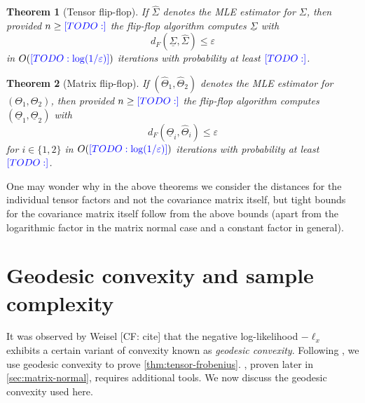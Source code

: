 \documentclass[aos]{imsart}
\newtheorem{theorem}{Theorem}
\theoremstyle{definition}
\newcommand{\eps}{\varepsilon}
\newcommand{\samp}{x}
\newcommand{\CF}[1]{{\color{purple}[CF: #1]}}
\newcommand{\TODO}[1]{{\color{blue}[TODO: #1]}}
\begin{document}
\begin{theorem}[Tensor flip-flop]\label{thm:tensor-flipflop} If $\hat{\Sigma}$ denotes the MLE estimator for $\Sigma$, then provided $n \geq \TODO{}$ the flip-flop algorithm computes $\underline{\Sigma}$ with
$$ d_F(\underline{\Sigma}, \hat{\Sigma}) \leq \eps $$
in $O(\TODO{\log(1/\eps)})$ iterations with probability at least $\TODO{}$.
\end{theorem}

\begin{theorem}[Matrix flip-flop]\label{thm:matrix-flipflop} If $(\hat{\Theta}_1, \hat{\Theta}_2) $ denotes the MLE estimator for $(\Theta_1, \Theta_2)$, then provided $n \geq \TODO{}$ the flip-flop algorithm computes $(\underline{\Theta}_1, \underline{\Theta}_2)$ with
$$ d_F(\underline{\Theta}_i, \hat{\Theta}_i) \leq \eps $$
for $i \in \{1,2\}$ in $O(\TODO{\log(1/\eps)})$ iterations with probability at least $\TODO{}$.
\end{theorem}

One may wonder why in the above theorems we consider the distances for the individual tensor factors and not the covariance matrix itself, but tight bounds for the covariance matrix itself follow from the above bounds (apart from the logarithmic factor in the matrix normal case and a constant factor in general).




\section{Geodesic convexity and sample complexity}\label{subsec:outline}
It was observed by Weisel \CF{cite} that the negative log-likelihood $-\ell_\samp$ exhibits a certain variant of convexity known as \emph{geodesic convexity}. Following \cite{FM20}, we use geodesic convexity to prove \cref{thm:tensor-frobenius}.
, proven later in \cref{sec:matrix-normal}, requires additional tools. We now discuss the geodesic convexity used here.
\end{document}
